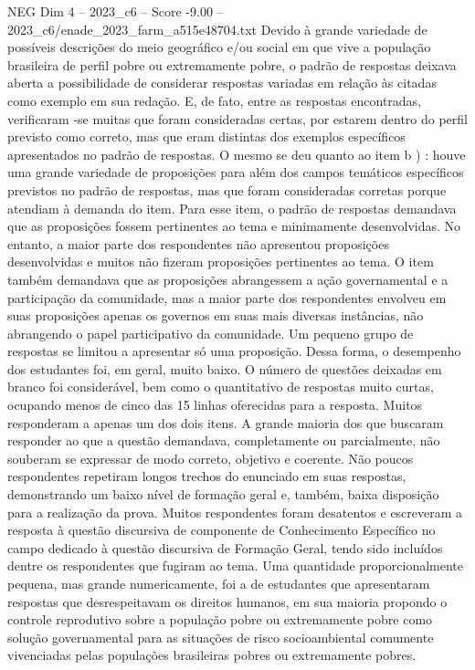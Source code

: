 \begin{textsample}{NEG Dim 4 – 2023\_c6 – Score -9.00 – 2023\_c6/enade\_2023\_farm\_a515e48704.txt}
Devido à grande variedade de possíveis descrições do meio geográfico e/ou social em que vive a população brasileira de perfil pobre ou extremamente pobre, o padrão de respostas deixava aberta a possibilidade de considerar respostas variadas em relação às citadas como exemplo em sua redação.
E, de fato, entre as respostas encontradas, verificaram -se muitas que foram consideradas certas, por estarem dentro do perfil previsto como correto, mas que eram distintas dos exemplos específicos apresentados no padrão de respostas.
O mesmo se deu quanto ao item b ) : houve uma grande variedade de proposições para além dos campos temáticos específicos previstos no padrão de respostas, mas que foram consideradas corretas porque atendiam à demanda do item.
Para esse item, o padrão de respostas demandava que as proposições fossem pertinentes ao tema e minimamente desenvolvidas.
No entanto, a maior parte dos respondentes não apresentou proposições desenvolvidas e muitos não fizeram proposições pertinentes ao tema.
O item também demandava que as proposições abrangessem a ação governamental e a participação da comunidade, mas a maior parte dos respondentes envolveu em suas proposições apenas os governos em suas mais diversas instâncias, não abrangendo o papel participativo da comunidade.
Um pequeno grupo de respostas se limitou a apresentar só uma proposição.
Dessa forma, o desempenho dos estudantes foi, em geral, muito baixo.
O número de questões deixadas em branco foi considerável, bem como o quantitativo de respostas muito curtas, ocupando menos de cinco das 15 linhas oferecidas para a resposta.
Muitos responderam a apenas um dos dois itens.
A grande maioria dos que buscaram responder ao que a questão demandava, completamente ou parcialmente, não souberam se expressar de modo correto, objetivo e coerente.
Não poucos respondentes repetiram longos trechos do enunciado em suas respostas, demonstrando um baixo nível de formação geral e, também, baixa disposição para a realização da prova.
Muitos respondentes foram desatentos e escreveram a resposta à questão discursiva de componente de Conhecimento Específico no campo dedicado à questão discursiva de Formação Geral, tendo sido incluídos dentre os respondentes que fugiram ao tema.
Uma quantidade proporcionalmente pequena, mas grande numericamente, foi a de estudantes que apresentaram respostas que desrespeitavam os direitos humanos, em sua maioria propondo o controle reprodutivo sobre a população pobre ou extremamente pobre como solução governamental para as situações de risco socioambiental comumente vivenciadas pelas populações brasileiras pobres ou extremamente pobres.

\end{textsample}
